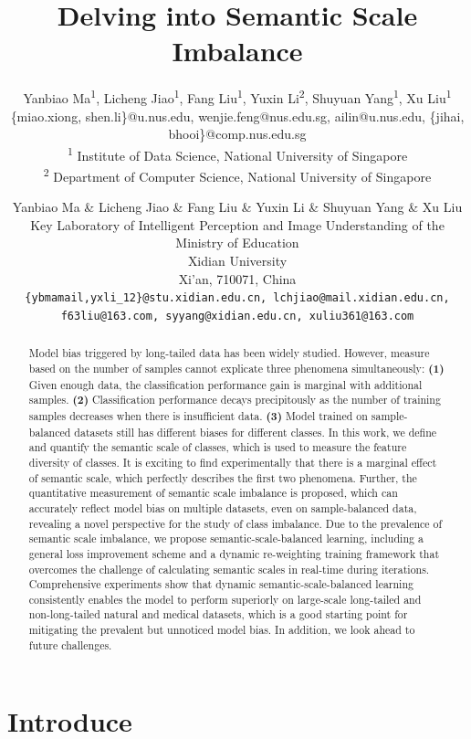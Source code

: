 \documentclass[10pt]{article} %
\title{Delving into Semantic Scale Imbalance}
\author{\name Yanbiao Ma\textsuperscript{1}, Licheng Jiao\textsuperscript{1}, Fang Liu\textsuperscript{1}, Yuxin Li\textsuperscript{2}, Shuyuan Yang\textsuperscript{1}, Xu Liu\textsuperscript{1} \\
        \email \{miao.xiong, shen.li\}@u.nus.edu, wenjie.feng@nus.edu.sg, ailin@u.nus.edu, \{jihai, bhooi\}@comp.nus.edu.sg \\
      \addr \textsuperscript{1} Institute of Data Science, National University of Singapore \\
      \textsuperscript{2} Department of Computer Science, National University of Singapore
}
\author{\setlength{\baselineskip}{12.5pt}{\name Yanbiao Ma, Licheng Jiao, Fang Liu, Yuxin Li, Shuyuan Yang, Xu Liu \\
      \addr \normalsize Key Laboratory of Intelligent Perception and Image Understanding of the Ministry of Education \\ 
      \normalsize Xidian University \\
      \normalsize Xi’an, 710071, China \\
      \email \normalsize \{ybmamail,yxli\_12\}@stu.xidian.edu.cn, lchjiao@mail.xidian.edu.cn, \\ f63liu@163.com, syyang@xidian.edu.cn, xuliu361@163.com 
}}
\author{Yanbiao Ma \& Licheng Jiao \& Fang Liu \& Yuxin Li  \& Shuyuan Yang  \& Xu Liu \\
Key Laboratory of Intelligent Perception and Image Understanding of the Ministry of Education\\
Xidian University\\
Xi’an, 710071, China \\
\texttt{\{ybmamail,yxli\_12\}@stu.xidian.edu.cn, lchjiao@mail.xidian.edu.cn,}  \\
\texttt{f63liu@163.com, syyang@xidian.edu.cn, xuliu361@163.com} 
}
\begin{document}
\maketitle




\begin{abstract}
Model bias triggered by long-tailed data has been widely studied. However, measure based on the number of samples cannot explicate three phenomena simultaneously: \textbf{(1)} Given enough data, the classification performance gain is marginal with additional samples. \textbf{\!(2)} Classification performance decays precipitously as the number of training samples decreases when there is insufficient data. \textbf{(3)} Model trained on sample-balanced datasets still has different biases for different classes. In this work, we define and quantify the semantic scale of classes, which is used to measure the feature diversity of classes. It is exciting to find experimentally that there is a marginal effect of semantic scale, which perfectly describes the first two phenomena. Further, the quantitative measurement of semantic scale imbalance is proposed, which can accurately reflect model bias on multiple datasets, even on sample-balanced data, revealing a novel perspective for the study of class imbalance. Due to the prevalence of semantic scale imbalance, we propose semantic-scale-balanced learning, including a general loss improvement scheme and a dynamic re-weighting training framework that overcomes the challenge of calculating semantic scales in real-time during iterations. Comprehensive experiments show that dynamic semantic-scale-balanced learning consistently enables the model to perform superiorly on large-scale long-tailed and non-long-tailed natural and medical datasets, which is a good starting point for mitigating the prevalent but unnoticed model bias. In addition, we look ahead to future challenges.
\end{abstract}

\section{Introduce}
\end{document}

